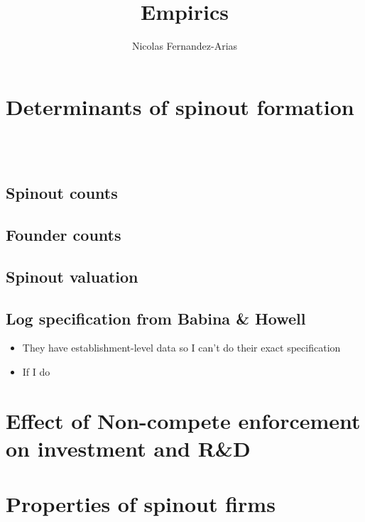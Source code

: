 \documentclass[12pt,english]{article}
\theoremstyle{remark}
\begin{document}
	
\title{Empirics}
\author{Nicolas Fernandez-Arias}
\maketitle

\section{Determinants of spinout formation}

 \\
 \\



\subsection{Spinout counts}
\small


\subsection{Founder counts}




\subsection{Spinout valuation}




\subsection{Log specification from Babina \& Howell}

\begin{itemize}
	\item They have establishment-level data so I can't do their exact specification
	\item If I do 
\end{itemize}


\section{Effect of Non-compete enforcement on investment and R\&D}







\section{Properties of spinout firms}
\end{document}
